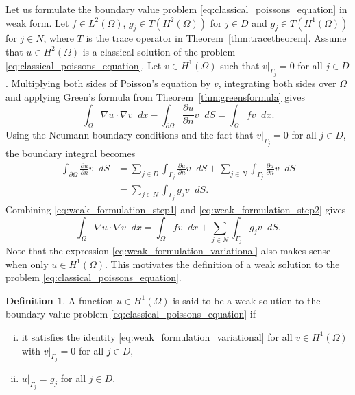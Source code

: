 \documentclass[english, 12pt, a4paper, sci, utf8, a-2b, online]{aaltothesis}
\theoremstyle{definition}
\newtheorem{definition}{Definition}[section]
\theoremstyle{plain}
\newcommand*\diff{\mathop{}\!d}
\numberwithin{equation}{section}
\begin{document}
Let us formulate the boundary value problem \eqref{eq:classical_poissons_equation}
in weak form.
Let $f \in L^2(\Omega)$, $g_j \in T(H^2(\Omega))$ for $j \in D$ and
$g_j \in T(H^1(\Omega))$ for $j \in N$, where $T$ is the trace operator in
Theorem~\ref{thm:tracetheorem}. Assume that $u \in H^2(\Omega)$
is a classical solution of the problem \eqref{eq:classical_poissons_equation}.
Let $v \in H^1(\Omega)$ such that $v|_{\Gamma_j} = 0$ for all $j \in D$.
Multiplying both sides of Poisson's equation by $v$,
integrating both sides over $\Omega$ and applying Green's formula
from Theorem~\ref{thm:greensformula} gives
\begin{equation}
    \label{eq:weak_formulation_step1}
    \int_{\Omega} \nabla u \cdot \nabla v \diff x
        - \int_{\partial \Omega} \frac{\partial u}{\partial n} v \diff S
    = \int_{\Omega} f v \diff x.
\end{equation}
Using the Neumann boundary conditions and the fact that
$v|_{\Gamma_j} = 0$ for all $j \in D$, the boundary integral becomes
\begin{align}
    \int_{\partial \Omega} \frac{\partial u}{\partial n} v \diff S
    &= \sum_{j \in D} \int_{\Gamma_j} \frac{\partial u}{\partial n} v \diff S
        + \sum_{j \in N} \int_{\Gamma_j} \frac{\partial u}{\partial n} v \diff S
            \nonumber \\
    \label{eq:weak_formulation_step2}
    &= \sum_{j \in N} \int_{\Gamma_j} g_j v \diff S.
\end{align}
Combining \eqref{eq:weak_formulation_step1} and \eqref{eq:weak_formulation_step2}
gives
\begin{equation}
    \label{eq:weak_formulation_variational}
    \int_{\Omega} \nabla u \cdot \nabla v \diff x
    = \int_{\Omega} f v \diff x + \sum_{j \in N} \int_{\Gamma_j} g_j v \diff S.
\end{equation}
Note that the expression \eqref{eq:weak_formulation_variational}
also makes sense when only
$u \in H^1(\Omega)$. This motivates the definition of a weak solution
to the problem \eqref{eq:classical_poissons_equation}.
\begin{definition}
    \label{def:weak_solution}
    A function $u \in H^1(\Omega)$ is said to be a weak solution to the
    boundary value problem \eqref{eq:classical_poissons_equation} if
    \begin{enumerate}[(i)]
        \item it satisfies the identity \eqref{eq:weak_formulation_variational}
        for all $v \in H^1(\Omega)$ with $v|_{\Gamma_j} = 0$ for all $j \in D$,
        \item $u|_{\Gamma_j} = g_j$ for all $j \in D$.
    \end{enumerate}
\end{definition}
\end{document}
